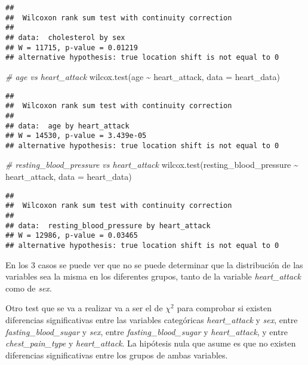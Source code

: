 \documentclass[
]{article}
\newenvironment{Shaded}{\begin{snugshade}}{\end{snugshade}}
\newcommand{\AttributeTok}[1]{\textcolor[rgb]{0.77,0.63,0.00}{#1}}
\newcommand{\CommentTok}[1]{\textcolor[rgb]{0.56,0.35,0.01}{\textit{#1}}}
\newcommand{\FunctionTok}[1]{\textcolor[rgb]{0.00,0.00,0.00}{#1}}
\newcommand{\NormalTok}[1]{#1}
\newcommand{\SpecialCharTok}[1]{\textcolor[rgb]{0.00,0.00,0.00}{#1}}
\begin{document}
\begin{verbatim}
## 
##  Wilcoxon rank sum test with continuity correction
## 
## data:  cholesterol by sex
## W = 11715, p-value = 0.01219
## alternative hypothesis: true location shift is not equal to 0
\end{verbatim}

\begin{Shaded}
\begin{Highlighting}[]
\CommentTok{\# age vs heart\_attack}
\FunctionTok{wilcox.test}\NormalTok{(age }\SpecialCharTok{\textasciitilde{}}\NormalTok{ heart\_attack, }\AttributeTok{data =}\NormalTok{ heart\_data)}
\end{Highlighting}
\end{Shaded}

\begin{verbatim}
## 
##  Wilcoxon rank sum test with continuity correction
## 
## data:  age by heart_attack
## W = 14530, p-value = 3.439e-05
## alternative hypothesis: true location shift is not equal to 0
\end{verbatim}

\begin{Shaded}
\begin{Highlighting}[]
\CommentTok{\# resting\_blood\_pressure vs heart\_attack}
\FunctionTok{wilcox.test}\NormalTok{(resting\_blood\_pressure }\SpecialCharTok{\textasciitilde{}}\NormalTok{ heart\_attack, }\AttributeTok{data =}\NormalTok{ heart\_data)}
\end{Highlighting}
\end{Shaded}

\begin{verbatim}
## 
##  Wilcoxon rank sum test with continuity correction
## 
## data:  resting_blood_pressure by heart_attack
## W = 12986, p-value = 0.03465
## alternative hypothesis: true location shift is not equal to 0
\end{verbatim}

En los 3 casos se puede ver que no se puede determinar que la
distribución de las variables sea la misma en los diferentes grupos,
tanto de la variable \emph{heart\_attack} como de \emph{sex}.

Otro test que se va a realizar va a ser el de \(\chi^2\) para comprobar
si existen diferencias significativas entre las variables categóricas
\emph{heart\_attack} y \emph{sex}, entre \emph{fasting\_blood\_sugar} y
\emph{sex}, entre \emph{fasting\_blood\_sugar} y \emph{heart\_attack}, y
entre \emph{chest\_pain\_type} y \emph{heart\_attack}. La hipótesis nula
que asume es que no existen diferencias significativas entre los grupos
de ambas variables.
\end{document}
